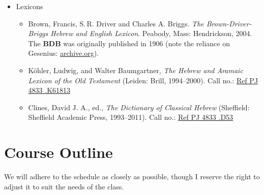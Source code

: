 \documentclass[titlepage]{article}
\begin{document}
\begin{itemize}
  \item Lexicons

    \begin{itemize}
      \item
        Brown, Francis, S.\,R. Driver and Charles A. Briggs. \emph{The
        Brown-Driver-Briggs Hebrew and English Lexicon}. Peabody, Mass:
        Hendrickson, 2004. The \textbf{BDB} was originally published in 1906
        (note the reliance on Gesenius: \href{https://archive.org/details/hebrewenglishlex00geseuoft}{archive.org}).
      \item
        Köhler, Ludwig, and Walter Baumgartner, \emph{The Hebrew
        and Aramaic Lexicon of the Old Testament} (Leiden: Brill,
        1994--2000). Call no.:
        \href{http://cat.tyndale.ca/vwebv/holdingsInfo?bibId=73713}{Ref PJ 4833 .K61813}
      \item
        Clines, David J. A., ed., \emph{The Dictionary of Classical
        Hebrew} (Sheffield: Sheffield Academic Press, 1993--2011). Call no.:
        \href{http://cat.tyndale.ca/vwebv/holdingsInfo?bibId=72831}{Ref PJ 4833 .D53}
    \end{itemize}

\end{itemize}

\section{Course Outline}
\label{outline}

We will adhere to the schedule as closely as possible, though I reserve
the right to adjust it to suit the needs of the class.
\end{document}

